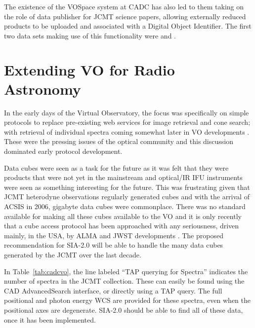 \documentclass[final,authoryear,5p,times,twocolumn]{elsarticle}
\begin{document}
The existence of the VOSpace system at CADC has also led to them
taking on the role of data publisher for JCMT science papers, allowing
externally reduced products to be uploaded and associated with a
Digital Object Identifier. The first two data sets making use of this
functionality were \citet{2012MNRAS.424.3050W} and
\citet{2013ApJS..209....8D}.

\section{Extending VO for Radio Astronomy}

In the early days of the Virtual Observatory, the focus was
specifically on simple protocols \citep{siap,cone} to replace pre-existing
web services for image retrieval and cone search; with retrieval of
individual spectra coming somewhat later in VO developments
\citep{ssap,splatvo}. These were the pressing issues of the optical
community and this discussion dominated early protocol development.

Data cubes were seen as a task for the future as it was
felt that they were products that were not yet in the mainstream and
optical/IR IFU instruments \citep[such as
UIST;][]{2004SPIE.5492.1160R} were seen as something interesting for
the future. This was frustrating given that JCMT heterodyne
observations regularly generated cubes and with the arrival of ACSIS
in 2006, gigabyte data cubes were commonplace. There was no standard
available for making all these cubes available to the VO and it is
only recently \citep[e.g.,][]{2014AAS...22325505T} that a cube access
protocol has been approached with any seriousness, driven mainly, in
the USA, by ALMA and JWST developments \citep[e.g.,
MIRI;][]{2010SPIE.7731E..10W}. The proposed
recommendation for SIA-2.0 \citep{siav2}
will be able to handle the many data cubes generated by the JCMT
over the last decade.

In Table~\ref{tab:cadcvo}, the line labeled ``TAP querying for Spectra''
indicates the number of spectra in the JCMT collection.  These can
easily be found using the CAD AdvancedSearch interface, or directly using
a TAP query.  The full positional and photon energy WCS are provided
for these spectra, even when the positional axes are degenerate.   SIA-2.0
should be able to find all of these data, once it has been implemented.
\end{document}
